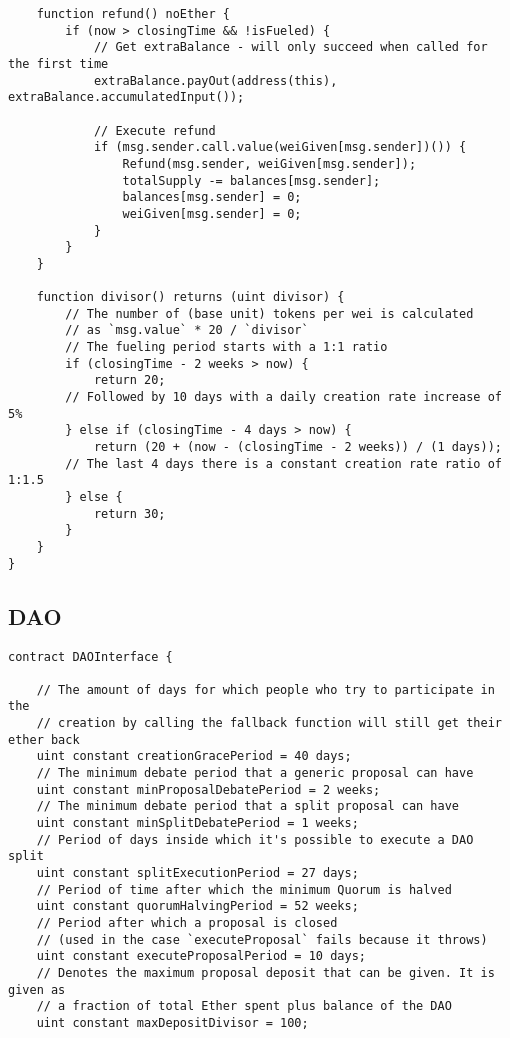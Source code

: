 \documentclass[9pt,oneside]{amsart}
\begin{document}
\begin{appendix}
\begin{verbatim}
    function refund() noEther {
        if (now > closingTime && !isFueled) {
            // Get extraBalance - will only succeed when called for the first time
            extraBalance.payOut(address(this), extraBalance.accumulatedInput());

            // Execute refund
            if (msg.sender.call.value(weiGiven[msg.sender])()) {
                Refund(msg.sender, weiGiven[msg.sender]);
                totalSupply -= balances[msg.sender];
                balances[msg.sender] = 0;
                weiGiven[msg.sender] = 0;
            }
        }
    }

    function divisor() returns (uint divisor) {
        // The number of (base unit) tokens per wei is calculated
        // as `msg.value` * 20 / `divisor`
        // The fueling period starts with a 1:1 ratio
        if (closingTime - 2 weeks > now) {
            return 20;
        // Followed by 10 days with a daily creation rate increase of 5%
        } else if (closingTime - 4 days > now) {
            return (20 + (now - (closingTime - 2 weeks)) / (1 days));
        // The last 4 days there is a constant creation rate ratio of 1:1.5
        } else {
            return 30;
        }
    }
}
\end{verbatim}
\subsection{DAO}\label{app:DAO}
\begin{verbatim}
contract DAOInterface {

    // The amount of days for which people who try to participate in the
    // creation by calling the fallback function will still get their ether back
    uint constant creationGracePeriod = 40 days;
    // The minimum debate period that a generic proposal can have
    uint constant minProposalDebatePeriod = 2 weeks;
    // The minimum debate period that a split proposal can have
    uint constant minSplitDebatePeriod = 1 weeks;
    // Period of days inside which it's possible to execute a DAO split
    uint constant splitExecutionPeriod = 27 days;
    // Period of time after which the minimum Quorum is halved
    uint constant quorumHalvingPeriod = 52 weeks;
    // Period after which a proposal is closed
    // (used in the case `executeProposal` fails because it throws)
    uint constant executeProposalPeriod = 10 days;
    // Denotes the maximum proposal deposit that can be given. It is given as
    // a fraction of total Ether spent plus balance of the DAO
    uint constant maxDepositDivisor = 100;


\end{verbatim}
\end{appendix}
\end{document}
